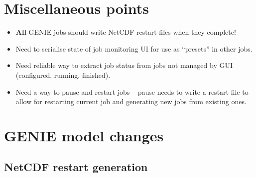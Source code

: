 \documentclass[a4paper,11pt,article]{memoir}
\begin{document}
\chapter{Miscellaneous points}

\begin{itemize}
  \item{\textbf{All} GENIE jobs should write NetCDF restart files when
    they complete!}
  \item{Need to serialise state of job monitoring UI for use as
    ``presets'' in other jobs.}
  \item{Need reliable way to extract job status from jobs not managed
    by GUI (configured, running, finished).}
  \item{Need a way to pause and restart jobs -- pause needs to write a
    restart file to allow for restarting current job and generating
    new jobs from existing ones.}
\end{itemize}


\newpage
\chapter{GENIE model changes}

\section{NetCDF restart generation}
\end{document}
